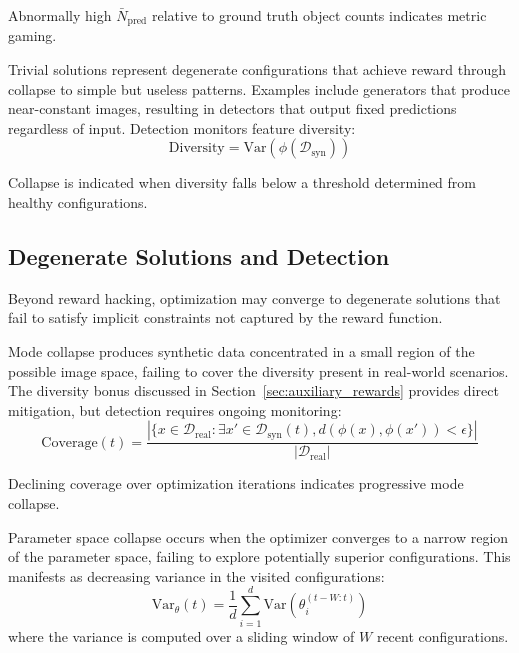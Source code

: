 Abnormally high $\bar{N}_{\text{pred}}$ relative to ground truth object counts indicates metric gaming.

Trivial solutions represent degenerate configurations that achieve reward through collapse to simple but useless patterns. Examples include generators that produce near-constant images, resulting in detectors that output fixed predictions regardless of input. Detection monitors feature diversity:
\begin{equation}
\text{Diversity} = \text{Var}(\phi(\mathcal{D}_{\text{syn}}))
\label{eq:feature_diversity}
\end{equation}

Collapse is indicated when diversity falls below a threshold determined from healthy configurations.

\subsection{Degenerate Solutions and Detection}

Beyond reward hacking, optimization may converge to degenerate solutions that fail to satisfy implicit constraints not captured by the reward function.

Mode collapse produces synthetic data concentrated in a small region of the possible image space, failing to cover the diversity present in real-world scenarios. The diversity bonus discussed in Section~\ref{sec:auxiliary_rewards} provides direct mitigation, but detection requires ongoing monitoring:
\begin{equation}
\text{Coverage}(t) = \frac{|\{x \in \mathcal{D}_{\text{real}} : \exists x' \in \mathcal{D}_{\text{syn}}(t), d(\phi(x), \phi(x')) < \epsilon\}|}{|\mathcal{D}_{\text{real}}|}
\label{eq:coverage_metric}
\end{equation}

Declining coverage over optimization iterations indicates progressive mode collapse.

Parameter space collapse occurs when the optimizer converges to a narrow region of the parameter space, failing to explore potentially superior configurations. This manifests as decreasing variance in the visited configurations:
\begin{equation}
\text{Var}_\theta(t) = \frac{1}{d} \sum_{i=1}^{d} \text{Var}(\theta_i^{(t-W:t)})
\label{eq:parameter_variance}
\end{equation}
where the variance is computed over a sliding window of $W$ recent configurations.


